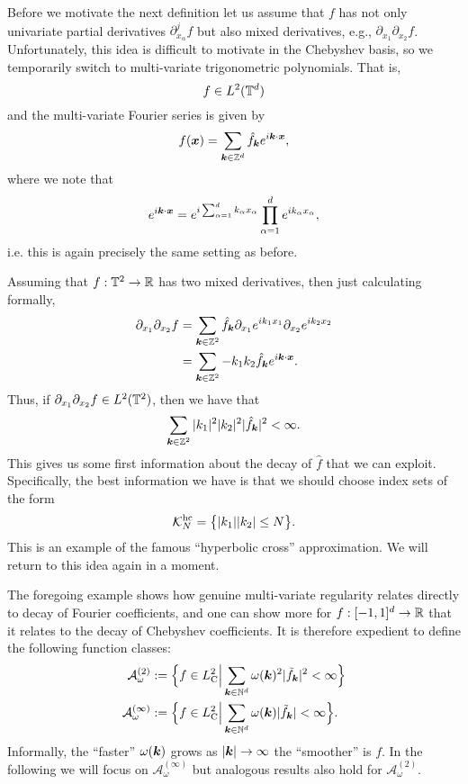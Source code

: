 Before we motivate the next definition let us assume that $f$ has not only
univariate partial derivatives $\partial_{x_\alpha}^j f$ but also mixed
derivatives, e.g., $\partial_{x_1} \partial_{x_2} f$. Unfortunately, this 
idea is difficult to motivate in the Chebyshev basis, so we temporarily 
switch to multi-variate trigonometric polynomials. That is, 
\[
    f \in L^2(\mathbb{T}^d)
\]
and the multi-variate Fourier series is given by 
\[
    f({\bm x}) = \sum_{{\bm k} \in \mathbb{Z}^d} \hat{f}_{\bm k} 
        e^{i {\bm k}\cdot {\bm x}},
\]
where we note that 
\[
    e^{i {\bm k}\cdot {\bm x}} =
    e^{i \sum_{\alpha = 1}^d k_\alpha x_\alpha}  
    \prod_{\alpha = 1}^d e^{i k_\alpha x_\alpha},
\]
i.e. this is again precisely the same setting as before. 

Assuming that $f : \mathbb{T}^2 \to \mathbb{R}$ has two mixed derivatives, then just
calculating formally, 
\begin{align*}
    \partial_{x_1} \partial_{x_2} f  
    &= 
    \sum_{{\bm k} \in \mathbb{Z}^2} \hat{f}_{\bm k} 
    \partial_{x_1} e^{ik_1x_1} \partial_{x_2} e^{ik_2x_2} \\ 
    &= 
    \sum_{{\bm k} \in \mathbb{Z}^2} - k_1 k_2 \hat{f}_{\bm k} 
    e^{i {\bm k} \cdot {\bm x}}.
\end{align*}
Thus, if $\partial_{x_1} \partial_{x_2} f  \in L^2(\mathbb{T}^2)$, then we have 
that 
\[
    \sum_{{\bm k} \in \mathbb{Z}^2} |k_1|^2 |k_2|^2 |\hat{f}_{{\bm k}}|^2 < \infty.
\]
This gives us some first information about the decay of $\hat{f}$ that we 
can exploit. Specifically, the best information we have is that we should choose 
index sets of the form 
\[
    \mathcal{K}_N^{\rm hc} =  \big\{ 
            |k_1| |k_2| \leq N \big\}.
\]
This is an example of the famous ``hyperbolic cross'' approximation. We will 
return to this idea again in a moment. 

The foregoing example shows how genuine multi-variate regularity 
relates directly to decay of Fourier coefficients, and one can show more 
for $f: [-1,1]^d \to \mathbb{R}$ that it relates to the decay of Chebyshev 
coefficients. It is therefore expedient to define the following function classes:
\begin{align*}
    \mathcal{A}_\omega^{(2)} 
    &:= 
        \Big\{ f \in L^2_{\rm C} \Big| 
             \sum_{{\bm k} \in \mathbb{N}^d} \omega({\bm k})^2 |\tilde{f}_{\bm k}|^2 < \infty \Big\} \\ 
    \mathcal{A}_\omega^{(\infty)} 
    &:= 
    \Big\{ f \in L^2_{\rm C} \Big| 
    \sum_{{\bm k} \in \mathbb{N}^d} \omega({\bm k}) |\tilde{f}_{\bm k}| < \infty \Big\}.
\end{align*}
Informally, the ``faster'' $\omega({\bm k})$ grows as $|{\bm k}| \to \infty$ the
``smoother'' is $f$. In the following we will focus on
$\mathcal{A}_\omega^{(\infty)}$ but analogous results also hold for
$\mathcal{A}_\omega^{(2)}$. 

